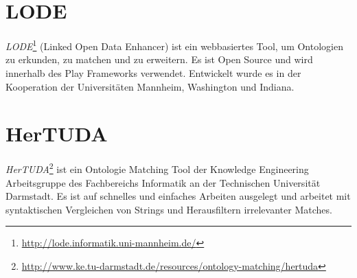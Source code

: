 		\section{LODE}
		\textit{LODE}\footnote{\url{http://lode.informatik.uni-mannheim.de/}} (Linked
		Open Data Enhancer) ist ein webbasiertes Tool, um Ontologien zu erkunden, zu matchen und zu erweitern. Es ist Open Source und
		wird innerhalb des Play Frameworks   verwendet. Entwickelt wurde es in der
		Kooperation der Universitäten Mannheim, Washington und Indiana.
		
		\section{HerTUDA}
		\textit{HerTUDA}\footnote{\url{http://www.ke.tu-darmstadt.de/resources/ontology-matching/hertuda}}
		ist ein Ontologie Matching Tool der Knowledge Engineering Arbeitsgruppe des Fachbereichs Informatik an der Technischen Universität
		Darmstadt. Es ist auf schnelles und einfaches Arbeiten ausgelegt und arbeitet
		mit syntaktischen Vergleichen von Strings und Herausfiltern irrelevanter
		Matches.
		
		\cleardoublepage
		\pagebreak[4]
